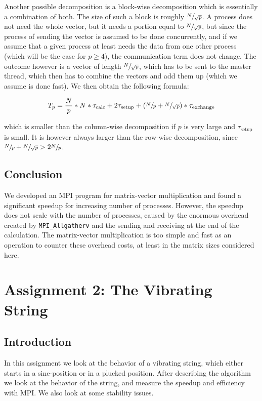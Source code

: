 \documentclass[11pt,a4paper,onecolumn]{article}
\begin{document}
Another possible decomposition is a block-wise decomposition which is essentially a combination of both. The size of such a block is roughly $\sfrac{N}{\sqrt{p}}$. A process does not need the whole vector, but it needs a portion equal to $\sfrac{N}{\sqrt{p}}$, but since the process of sending the vector is assumed to be done concurrently, and if we assume that a given process at least needs the data from one other process (which will be the case for $p \geq 4$), the communication term does not change. The outcome however is a vector of length $\sfrac{N}{\sqrt{p}}$, which has to be sent to the master thread, which then has to combine the vectors and add them up (which we assume is done fast). We then obtain the following formula:

\begin{equation}
  T_p = \frac{N}{p} * N * \tau_{\text{calc}} + 2\tau_{\text{setup}} + (\sfrac{N}{p} + \sfrac{N}{\sqrt{p}})*\tau_{\text{exchange}}
\end{equation}

which is smaller than the column-wise decomposition if $p$ is very large and $\tau_{\text{setup}}$ is small. It is however always larger than the row-wise decomposition, since $\sfrac{N}{p} + \sfrac{N}{\sqrt{p}} > 2\sfrac{N}{p}$.

\subsection{Conclusion}

We developed an MPI program for matrix-vector multiplication and found a significant speedup for increasing number of processes. However, the speedup does not scale with the number of processes, caused by the enormous overhead created by \texttt{MPI\_Allgatherv} and the sending and receiving at the end of the calculation. The matrix-vector multiplication is too simple and fast as an operation to counter these overhead costs, at least in the matrix sizes considered here.

\newpage

\section{Assignment 2: The Vibrating String}

\subsection{Introduction}
In this assignment we look at the behavior of a vibrating string, which either starts in a sine-position or in a plucked position. After describing the algorithm we look at the behavior of the string, and measure the speedup and efficiency with MPI. We also look at some stability issues.
\end{document}
